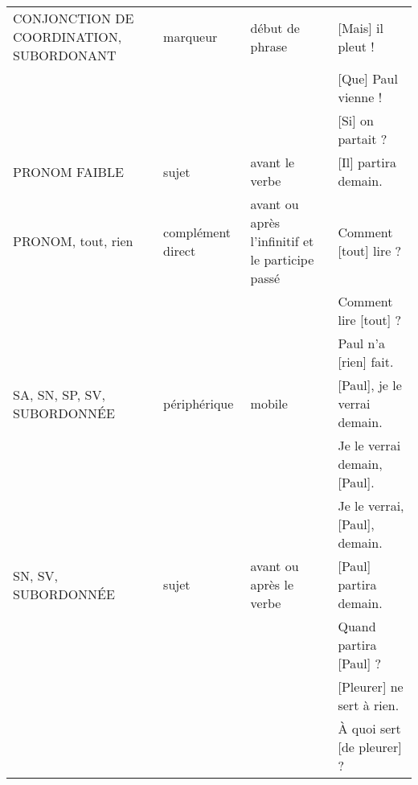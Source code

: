 \documentclass[UTF8]{report}
\begin{document}
\begin{longtable}{|p{3.5cm}|p{3.5cm}|p{3.5cm}|p{5cm}|}
    \hline
    CONJONCTION DE COORDINATION, SUBORDONANT & marqueur & début de phrase & [Mais] il pleut ! \\
    & & & [Que] Paul vienne ! \\
    & & & [Si] on partait ? \\
    \hline
    PRONOM FAIBLE & sujet & avant le verbe & [Il] partira demain. \\
    \hline
    PRONOM, tout, rien & complément direct & avant ou après l'infinitif et le participe passé & Comment [tout] lire ? \\
    & & & Comment lire [tout] ? \\
    & & & Paul n'a [rien] fait. \\
    \hline
    SA, SN, SP, SV, SUBORDONNÉE & périphérique & mobile & [Paul], je le verrai demain. \\
    & & & Je le verrai demain, [Paul]. \\
    & & & Je le verrai, [Paul], demain. \\
    \hline
    SN, SV, SUBORDONNÉE & sujet & avant ou après le verbe & [Paul] partira demain. \\
    & & & Quand partira [Paul] ? \\
    & & & [Pleurer] ne sert à rien. \\
    & & & À quoi sert [de pleurer] ? \\
    \hline
\end{longtable}
\end{document}
